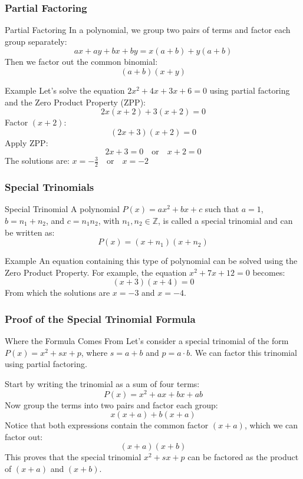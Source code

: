 \documentclass[10pt]{beamer}
\begin{document}
	\begin{frame}
		\frametitle{Partial Factoring}\footnotesize
		
		\begin{block}{\footnotesize Partial Factoring}
			\footnotesize In a polynomial, we group two pairs of terms and factor each group separately:
			\[
			ax + ay + bx + by = x(a + b) + y(a + b)
			\]
			Then we factor out the common binomial:
			\[
			(a + b)(x + y)
			\]
		\end{block}
		
		\begin{block}{\footnotesize Example}
			\footnotesize Let's solve the equation \(2x^2 + 4x + 3x + 6 = 0\) using partial factoring and the Zero Product Property (ZPP):
			\[
			2x(x + 2) + 3(x + 2) = 0
			\]
			Factor \((x + 2)\):
			\[
			(2x + 3)(x + 2) = 0
			\]
			Apply ZPP:
			\[
			2x + 3 = 0 \quad \text{or} \quad x + 2 = 0
			\]
			The solutions are:
			$
			x = -\frac{3}{2} \quad \text{or} \quad x = -2
			$
		\end{block}
	\end{frame}
	
	\begin{frame}
		\frametitle{Special Trinomials}
		
		\begin{block}{Special Trinomial}
			A polynomial \(P(x) = ax^2 + bx + c\) such that \(a = 1\), \(b = n_1 + n_2\), and \(c = n_1 n_2\), with \(n_1, n_2 \in \mathbb{Z}\), is called a special trinomial and can be written as:
			\[
			P(x) = (x + n_1)(x + n_2)
			\]
		\end{block}
		
		\setbeamercolor{block body}{fg=black, bg=green!20}
		\begin{block}{Example}
			An equation containing this type of polynomial can be solved using the Zero Product Property. For example, the equation \(x^2 + 7x + 12 = 0\) becomes:
			\[
			(x + 3)(x + 4) = 0
			\]
			From which the solutions are \(x = -3\) and \(x = -4\).
		\end{block}
	\end{frame}
	\begin{frame}
		\frametitle{Proof of the Special Trinomial Formula}
		
		\begin{block}{Where the Formula Comes From}
			\small Let's consider a special trinomial of the form \(P(x) = x^2 + sx + p\), where \(s = a + b\) and \(p = a \cdot b\). We can factor this trinomial using partial factoring.
			
			Start by writing the trinomial as a sum of four terms:
			\[
			P(x) = x^2 + ax + bx + ab
			\]
			Now group the terms into two pairs and factor each group:
			\[
			x(x + a) + b(x + a)
			\]
			Notice that both expressions contain the common factor \((x + a)\), which we can factor out:
			\[
			(x + a)(x + b)
			\]
			This proves that the special trinomial \(x^2 + sx + p\) can be factored as the product of \((x + a)\) and \((x + b)\).
		\end{block}
	\end{frame}
	
\end{document}
